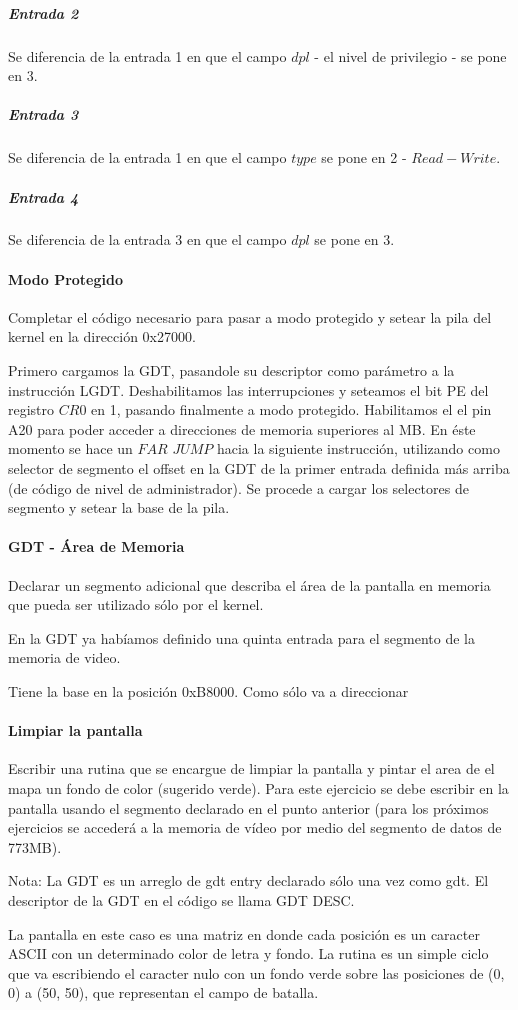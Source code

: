 \subparagraph*{Entrada 2}

Se diferencia de la entrada 1 en que el campo $dpl$ - el nivel de privilegio - se pone en 3.

\subparagraph*{Entrada 3}

Se diferencia de la entrada 1 en que el campo $type$ se pone en 2 - $Read-Write$.

\subparagraph*{Entrada 4}

Se diferencia de la entrada 3 en que el campo $dpl$ se pone en 3.




\paragraph{Modo Protegido}\label{subsubsec:ej1-b}
Completar el código necesario para pasar a modo protegido y setear la pila del
kernel en la dirección 0x27000.
\hruler

Primero cargamos la GDT, pasandole su descriptor como parámetro a la instrucción LGDT. Deshabilitamos las interrupciones y seteamos el bit PE del
registro $CR0$ en 1, pasando finalmente a modo protegido.
Habilitamos el el pin A20 para poder acceder a direcciones de memoria superiores al MB.
En éste momento se hace un $FAR$ $JUMP$ hacia la siguiente instrucción, utilizando como selector de segmento el offset en la GDT de la primer 
entrada definida más arriba (de código de nivel de administrador).
Se procede a cargar los selectores de segmento y setear la base de la pila.

\paragraph{GDT - Área de Memoria}\label{subsubsec:ej1-c}
Declarar un segmento adicional que describa el área de la pantalla en memoria
que pueda ser utilizado sólo por el kernel.
\hruler

En la GDT ya habíamos definido una quinta entrada para el segmento de la memoria de video.

Tiene la base en la posición 0xB8000. Como sólo va a direccionar \fixme{}

\paragraph{Limpiar la pantalla}\label{subsubsec:ej1-d}
Escribir una rutina que se encargue de limpiar la pantalla y pintar el area de
el mapa un fondo de color (sugerido verde). Para este ejercicio se debe escribir
en la pantalla usando el segmento declarado en el punto anterior (para los
próximos ejercicios se accederá a la memoria de vídeo por medio del segmento de
datos de 773MB).

Nota: La GDT es un arreglo de gdt entry declarado sólo una vez como gdt. El
descriptor de la GDT en el código se llama GDT DESC.

\hruler
La pantalla en este caso es una matriz en donde cada posición es un caracter ASCII con un determinado color de letra y fondo. La rutina es un
simple ciclo que va escribiendo el caracter nulo con un fondo verde sobre las posiciones de (0, 0) a (50, 50), que representan el campo de
batalla.
